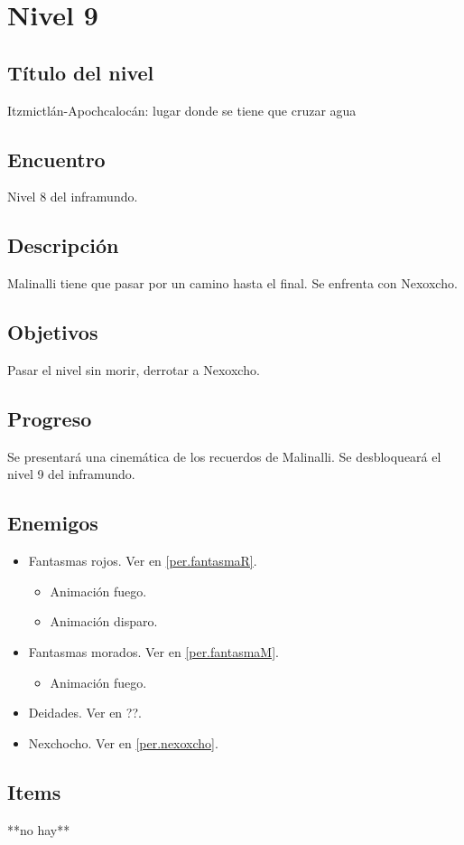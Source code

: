 	\section{Nivel 9}
	\subsection{Título del nivel}
	Itzmictlán-Apochcalocán: lugar donde se tiene que cruzar agua
	\subsection{Encuentro}
	Nivel 8 del inframundo.
	\subsection{Descripción}
	Malinalli tiene que pasar por un camino hasta el final. Se enfrenta con Nexoxcho.
	\subsection{Objetivos}
	Pasar el nivel  sin morir, derrotar a Nexoxcho.
	\subsection{Progreso}
	Se presentará una cinemática de los recuerdos de Malinalli. Se desbloqueará el nivel 9 del inframundo. 
	\subsection{Enemigos}
	\begin{itemize}
		\item Fantasmas rojos. Ver en \ref{per.fantasmaR}.
		\begin{itemize}
				\item Animación fuego.
				\item Animación disparo.
			\end{itemize}
		\item Fantasmas morados. Ver en \ref{per.fantasmaM}.
		\begin{itemize}
				\item Animación fuego.
			\end{itemize}
		\item Deidades. Ver en ??.
		\item Nexchocho. Ver en \ref{per.nexoxcho}.
	\end{itemize}
	\subsection{Items}
	**no hay**
